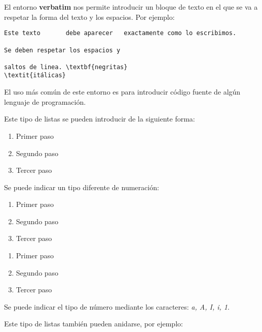 \documentclass[letterpaper,11pt]{article}
\begin{document}
\begin{•}

El entorno \textbf{verbatim} nos permite introducir un bloque de texto en el que se va a respetar la forma del texto y los espacios. Por ejemplo:

\begin{verbatim}
Este texto       debe aparecer   exactamente como lo escribimos.

Se deben respetar los espacios y

saltos de linea. \textbf{negritas} 
\textit{itálicas}
\end{verbatim}

El uso más común de este entorno es para introducir código fuente de algún lenguaje de programación.


Este tipo de listas se pueden introducir de la siguiente forma:

\begin{enumerate}
	\item Primer paso
	\item Segundo paso
	\item Tercer paso
\end{enumerate}

Se puede indicar un tipo diferente de numeración:

\begin{enumerate}[I]
	\item Primer paso
	\item Segundo paso
	\item Tercer paso
\end{enumerate}

\bigskip

\begin{enumerate}[a]
	\item Primer paso
	\item Segundo paso
	\item Tercer paso
\end{enumerate}

Se puede indicar el tipo de número mediante los caracteres: \textit{a, A, I, i, 1}.

Este tipo de listas también pueden anidarse, por ejemplo:


\end{•}
\end{document}
